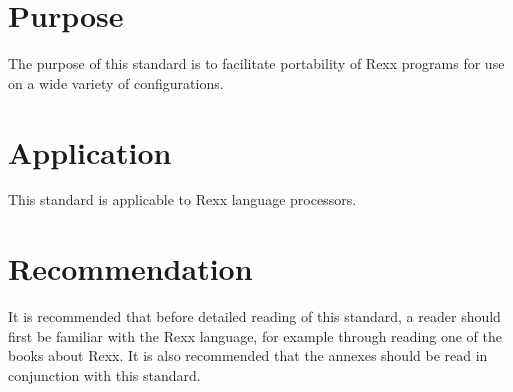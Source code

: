 \hypertarget{purpose}{%
\section{Purpose}\label{purpose}}

The purpose of this standard is to facilitate portability of Rexx
programs for use on a wide variety of configurations.

\hypertarget{application}{%
\section{Application}\label{application}}

This standard is applicable to Rexx language processors.

\hypertarget{recommendation}{%
\section{Recommendation}\label{recommendation}}

It is recommended that before detailed reading of this standard, a
reader should first be familiar with the Rexx language, for example
through reading one of the books about Rexx. It is also recommended that
the annexes should be read in conjunction with this standard.

